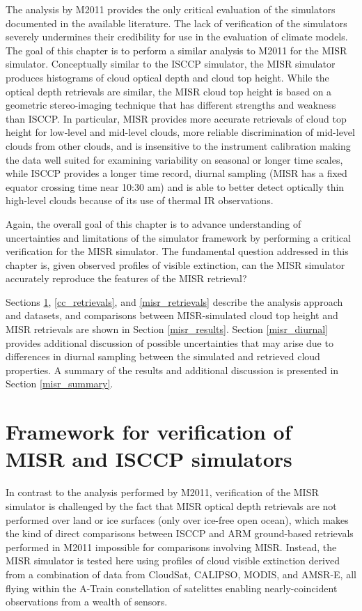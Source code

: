 The analysis by M2011 provides the only critical evaluation of the simulators documented in the available literature. The lack of verification of the simulators severely undermines their credibility for use in the evaluation of climate models. The goal of this chapter is to perform a similar analysis to M2011 for the MISR simulator. Conceptually similar to the ISCCP simulator, the MISR simulator produces histograms of cloud optical depth and cloud top height. While the optical depth retrievals are similar, the MISR cloud top height is based on a geometric stereo-imaging technique that has different strengths and weakness than ISCCP. In particular, MISR provides more accurate retrievals of cloud top height for low‐level and mid-level clouds, more reliable discrimination of mid-level clouds from other clouds, and is insensitive to the instrument calibration making the data well suited for examining variability on seasonal or longer time scales, while ISCCP provides a longer time record, diurnal sampling (MISR has a fixed equator crossing time near 10:30 am) and is able to better detect optically thin high-level clouds because of its use of thermal IR observations.

Again, the overall goal of this chapter is to advance understanding of uncertainties and limitations of the simulator framework by performing a critical verification for the MISR simulator. The fundamental question addressed in this chapter is, given observed profiles of visible extinction, can the MISR simulator accurately reproduce the features of the MISR retrieval?

Sections \ref{misr_framework}, \ref{cc_retrievals}, and \ref{misr_retrievals} describe the analysis approach and datasets, and comparisons between MISR-simulated cloud top height and MISR retrievals are shown in Section \ref{misr_results}. Section \ref{misr_diurnal} provides additional discussion of possible uncertainties that may arise due to differences in diurnal sampling between the simulated and retrieved cloud properties. A summary of the results and additional discussion is presented in Section \ref{misr_summary}. 


\section{Framework for verification of MISR and ISCCP simulators}
\label{misr_framework}
In contrast to the analysis performed by M2011, verification of the MISR simulator is challenged by the fact that MISR optical depth retrievals are not performed over land or ice surfaces (only over ice-free open ocean), which makes the kind of direct comparisons between ISCCP and ARM ground-based retrievals performed in M2011 impossible for comparisons involving MISR. Instead, the MISR simulator is tested here using profiles of cloud visible extinction derived from a combination of data from CloudSat, CALIPSO, MODIS, and AMSR-E, all flying within the A-Train constellation of satelittes enabling nearly-coincident observations from a wealth of sensors.

